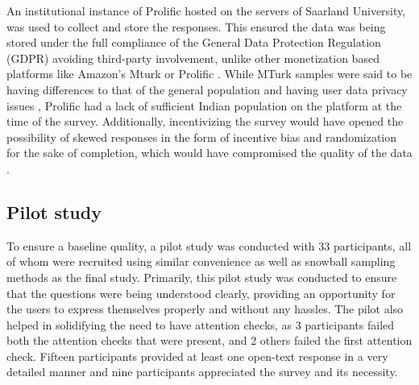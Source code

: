 An institutional instance of Prolific \cite{Qualtrics2026} hosted on the servers of Saarland University, was used to collect and store the responses. This ensured the data was being stored under the full compliance of the General Data Protection Regulation (GDPR) avoiding third-party involvement, unlike other monetization based platforms like Amazon's Mturk \cite{MTurk2026} or Prolific \cite{Prolific2026}. While MTurk samples were said to be having differences to that of the general population \cite{3235838.3235842} and having user data privacy issues \cite{MTurkprivacy}, Prolific had a lack of sufficient Indian population on the platform at the time of the survey. Additionally, incentivizing the survey would have opened the possibility of skewed responses in the form of incentive bias and randomization for the sake of completion, which would have compromised the quality of the data \cite{Straightlining}. 

\subsection{Pilot study}  \label{Subsec: pilot study}

To ensure a baseline quality, a pilot study was conducted with 33 participants, all of whom were recruited using similar convenience as well as snowball sampling methods as the final study. Primarily, this pilot study was conducted to ensure that the questions were being understood clearly, providing an opportunity for the users to express themselves properly and without any hassles. The pilot also helped in solidifying the need to have attention checks, as 3 participants failed both the attention checks that were present, and 2 others failed the first attention check. Fifteen participants provided at least one open-text response in a very detailed manner and nine participants appreciated the survey and its necessity.

